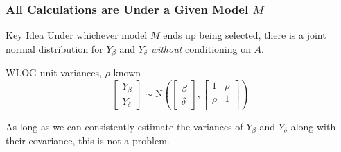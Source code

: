 \begin{frame}
  \frametitle{All Calculations are Under a Given Model $M$}
  \begin{block}{Key Idea}
Under whichever model $M$ ends up being selected, there is a joint normal distribution for $Y_\beta$ and $Y_\delta$ \emph{without} conditioning on $A$.
\end{block}

  \begin{block}{WLOG unit variances, $\rho$ known}
\[
  \left[
  \begin{array}{c}
    Y_\beta \\ Y_{\delta}
  \end{array}
\right] \sim \mbox{N}\left( \left[
\begin{array}{c}
  \beta \\ \delta
\end{array}
\right], \left[
\begin{array}{cc}
  1 & \rho \\
  \rho & 1\\
\end{array}
\right]\right)
\]

As long as we can consistently estimate the variances of $Y_{\beta}$ and $Y_{\delta}$ along with their covariance, this is not a problem.
  \end{block}



\end{frame}
